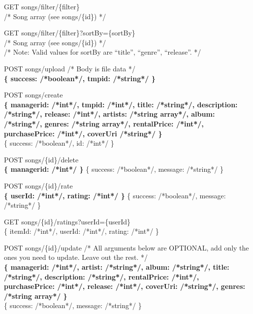 GET  songs/filter/\{filter\} \\
/* Song array (see songs/\{id\}) */

GET  songs/filter/\{filter\}?sortBy=\{sortBy\} \\
/* Song array (see songs/\{id\}) */ \\
/* Note: Valid values for sortBy are “title”, “genre”, “release”. */

POST songs/upload /* Body is file data */ \\
\textbf{\{ success: /*boolean*/, tmpid: /*string*/ \}}

POST songs/create \\
\textbf{\{ managerid: /*int*/, tmpid: /*int*/, title: /*string*/, description: /*string*/, release: /*int*/, artists: /*string array*/, album: /*string*/, genres: /*string array*/, rentalPrice: /*int*/, purchasePrice: /*int*/, coverUri /*string*/ \}} \\
\{ success: /*boolean*/, id: /*int*/ \}

POST songs/\{id\}/delete \\
\textbf{\{ managerid: /*int*/ \}}
\{ success: /*boolean*/, message: /*string*/ \}

POST songs/\{id\}/rate \\
\textbf{\{ userId: /*int*/, rating: /*int*/ \}}
\{ success: /*boolean*/, message: /*string*/ \}

GET songs/\{id\}/ratings?userId=\{userId\} \\
\{ itemId: /*int*/, userId: /*int*/, rating: /*int*/ \}

POST songs/\{id\}/update /* All arguments below are OPTIONAL, add only the ones you need to update. Leave out the rest. */ \\
\textbf{\{ managerid: /*int*/, artist: /*string*/, album: /*string*/, title: /*string*/, description: /*string*/, 
rentalPrice: /*int*/, purchasePrice: /*int*/, release: /*int*/, coverUri: /*string*/, genres: /*string array*/ \}} \\
\{ success: /*boolean*/, message: /*string*/ \}